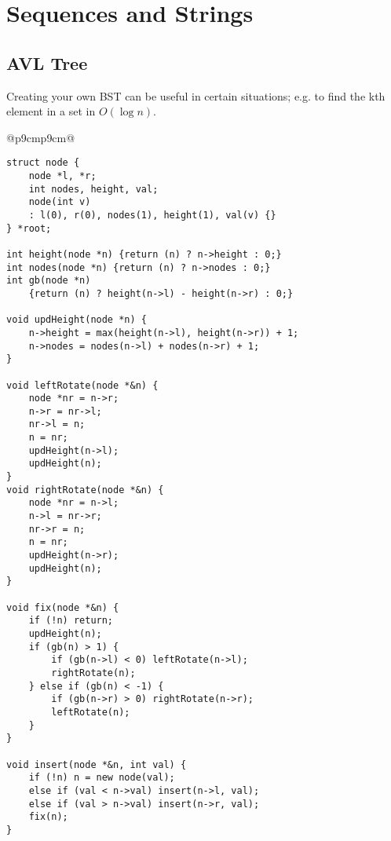 \documentclass[letterpaper]{article}
\begin{document}
\clearpage

\section{Sequences and Strings}

\subsection {AVL Tree}

Creating your own BST can be useful in certain situations; e.g. to find the kth element in a set in $O\left(\log n\right)$.

\begin{tabular}{@{}p{9cm}p{9cm}@{}}
    \begin{lstlisting}
struct node {
	node *l, *r;
	int nodes, height, val;
	node(int v)
	: l(0), r(0), nodes(1), height(1), val(v) {}
} *root;

int height(node *n) {return (n) ? n->height : 0;}
int nodes(node *n) {return (n) ? n->nodes : 0;}
int gb(node *n)
	{return (n) ? height(n->l) - height(n->r) : 0;}

void updHeight(node *n) {
	n->height = max(height(n->l), height(n->r)) + 1;
	n->nodes = nodes(n->l) + nodes(n->r) + 1;
}

void leftRotate(node *&n) {
	node *nr = n->r;
	n->r = nr->l;
	nr->l = n;
	n = nr;
	updHeight(n->l);
	updHeight(n);
}
void rightRotate(node *&n) {
	node *nr = n->l;
	n->l = nr->r;
	nr->r = n;
	n = nr;
	updHeight(n->r);
	updHeight(n);
}

void fix(node *&n) {
	if (!n) return;
	updHeight(n);
	if (gb(n) > 1) {
		if (gb(n->l) < 0) leftRotate(n->l);
		rightRotate(n);
	} else if (gb(n) < -1) {
		if (gb(n->r) > 0) rightRotate(n->r);
		leftRotate(n);
	}
}

void insert(node *&n, int val) {
	if (!n) n = new node(val);
	else if (val < n->val) insert(n->l, val);
	else if (val > n->val) insert(n->r, val);
	fix(n);
}


\end{lstlisting}
\end{tabular}
\end{document}
